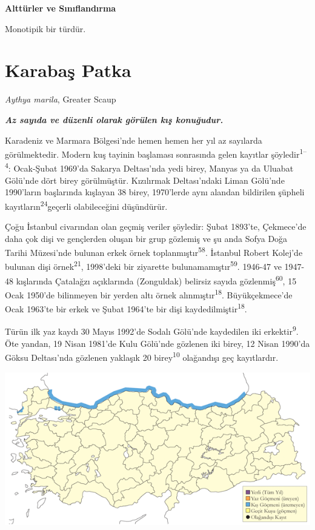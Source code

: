 \documentclass[
  letterpaper,
  DIV=11,
  numbers=noendperiod]{scrreprt}
\begin{document}
\textbf{Alttürler ve Sınıflandırma}

Monotipik bir türdür.

\hypertarget{karabaux15f-patka}{%
\section{Karabaş Patka}\label{karabaux15f-patka}}

\emph{Aythya marila}, Greater Scaup

\textbf{\emph{Az sayıda ve düzenli olarak görülen kış konuğudur.}}

Karadeniz ve Marmara Bölgesi'nde hemen hemen her yıl az sayılarda
görülmektedir. Modern kuş tayinin başlaması sonrasında gelen kayıtlar
şöyledir\textsuperscript{1--4}: Ocak-Şubat 1969'da Sakarya Deltası'nda
yedi birey, Manyas ya da Uluabat Gölü'nde dört birey görülmüştür.
Kızılırmak Deltası'ndaki Liman Gölü'nde 1990'ların başlarında kışlayan
38 birey, 1970'lerde aynı alandan bildirilen şüpheli
kayıtların\textsuperscript{24}geçerli olabileceğini düşündürür.

Çoğu İstanbul civarından olan geçmiş veriler şöyledir: Şubat 1893'te,
Çekmece'de daha çok dişi ve gençlerden oluşan bir grup gözlemiş ve şu
anda Sofya Doğa Tarihi Müzesi'nde bulunan erkek örnek
toplanmıştır\textsuperscript{58}. İstanbul Robert Kolej'de bulunan dişi
örnek\textsuperscript{21}, 1998'deki bir ziyarette
bulunamamıştır\textsuperscript{59}. 1946-47 ve 1947-48 kışlarında
Çatalağzı açıklarında (Zonguldak) belirsiz sayıda
gözlenmiş\textsuperscript{60}, 15 Ocak 1950'de bilinmeyen bir yerden
altı örnek alınmıştır\textsuperscript{18}. Büyükçekmece'de Ocak 1963'te
bir erkek ve Şubat 1964'te bir dişi kaydedilmiştir\textsuperscript{18}.

Türün ilk yaz kaydı 30 Mayıs 1992'de Sodalı Gölü'nde kaydedilen iki
erkektir\textsuperscript{9}. Öte yandan, 19 Nisan 1981'de Kulu Gölü'nde
gözlenen iki birey, 12 Nisan 1990'da Göksu Deltası'nda gözlenen yaklaşık
20 birey\textsuperscript{10} olağandışı geç kayıtlardır.

\includegraphics{images/harita_Page_026.png}
\end{document}
